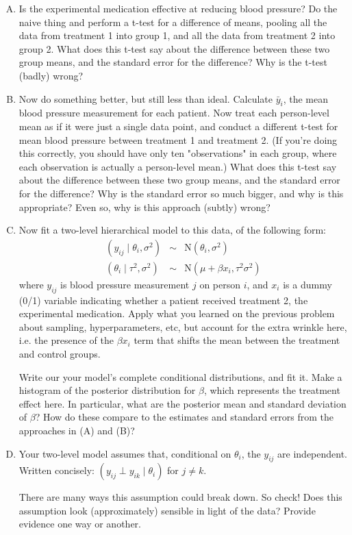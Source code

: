 \documentclass[11pt]{article}
\begin{document}
\begin{enumerate}[(A)]

\item Is the experimental medication effective at reducing blood pressure?  Do the naive thing and perform a t-test for a difference of means, pooling all the data from treatment 1 into group 1, and all the data from treatment 2 into group 2.  What does this t-test say about the difference between these two group means, and the standard error for the difference?  Why is the t-test (badly) wrong?

\item Now do something better, but still less than ideal.  Calculate $\bar{y}_i$, the mean blood pressure measurement for each patient.  Now treat each person-level mean as if it were just a single data point, and conduct a different t-test for mean blood pressure between treatment 1 and treatment 2.  (If you're doing this correctly, you should have only ten "observations" in each group, where each observation is actually a person-level mean.) What does this t-test say about the difference between these two group means, and the standard error for the difference?  Why is the standard error so much bigger, and why is this appropriate?  Even so, why is this approach (subtly) wrong?  

\item Now fit a two-level hierarchical model to this data, of the following form:
\begin{eqnarray*}
(y_{ij} \mid \theta_i, \sigma^2) &\sim& \mbox{N}(\theta_i, \sigma^2) \\
(\theta_i \mid \tau^2, \sigma^2) &\sim& \mbox{N}(\mu + \beta x_i, \tau^2 \sigma^2)
\end{eqnarray*}
where $y_{ij}$ is blood pressure measurement $j$ on person $i$, and $x_i$ is a dummy (0/1) variable indicating whether a patient received treatment 2, the experimental medication.   Apply what you learned on the previous problem about sampling, hyperparameters, etc, but account for the extra wrinkle here, i.e. the presence of the $\beta x_i$ term that shifts the mean between the treatment and control groups.  

Write our your model's complete conditional distributions, and fit it.  Make a histogram of the posterior distribution for $\beta$, which represents the treatment effect here.  In particular, what are the posterior mean and standard deviation of $\beta$?  How do these compare to the estimates and standard errors from the approaches in (A) and (B)?  

\item Your two-level model assumes that, conditional on $\theta_i$, the $y_{ij}$ are independent.  Written concisely: $(y_{ij} \perp y_{ik} \mid \theta_i)$ for $j \neq k$. 

There are many ways this assumption could break down.  So check!  Does this assumption look (approximately) sensible in light of the data?  Provide evidence one way or another.  

\end{enumerate}
\end{document}

